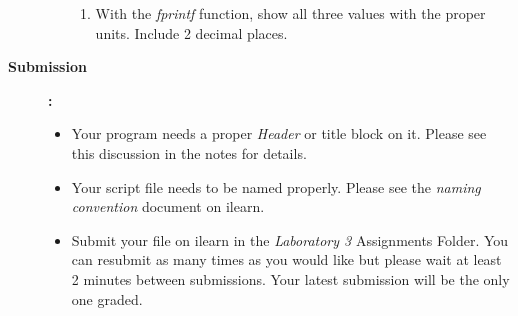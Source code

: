 \documentclass[11pt]{article}
\newcommand{\NUM}{3}
\begin{document}
\begin{description}
\begin{enumerate}
\begin{enumerate}
           \item 
           With the {\it fprintf} function, show all three values with the proper units. Include 2 decimal places.
           
           
             \end{enumerate}
        	\end{enumerate}

\item [\textbf{Submission }]\textbf{:} \\
			\begin{itemize}
				\item Your program needs a proper {\it Header} or title block on it. Please see this discussion in the notes for details.\\
				\item Your script file needs to be named properly. Please see the {\it naming convention} document on ilearn. \\
				\item Submit your file on ilearn in the {\it Laboratory \NUM} Assignments Folder. You can resubmit as many times as you would like but please wait at least 2 minutes between submissions. Your latest submission will be the only one graded.

			\end{itemize}


	\end{description}
 
\end{document}
